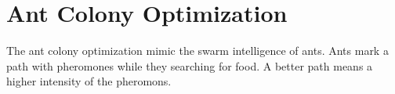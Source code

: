 \section{Ant Colony Optimization}

The ant colony optimization mimic the swarm intelligence of ants. Ants mark a
path with pheromones while they searching for food. A better path means a higher
intensity of the pheromons.
